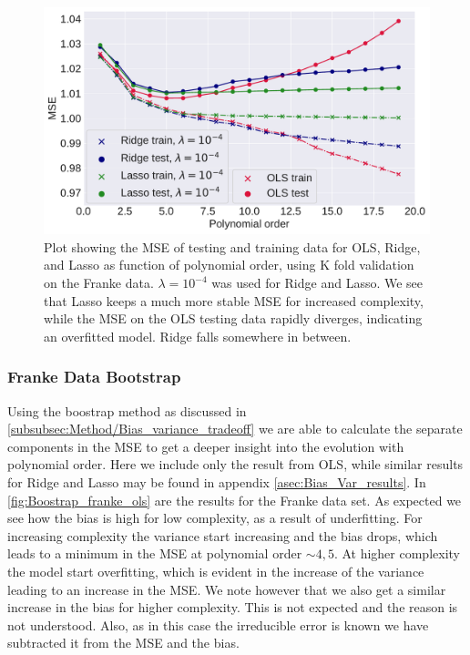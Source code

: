 \documentclass[10pt, twocolumn]{article}
\begin{document}
\begin{figure}[h!]
    \centering
    \includegraphics[scale=0.4]{../figs/Franke_OLS_Ridge_polyorders.pdf}
    \caption{Plot showing the MSE of testing and training data for OLS, Ridge, and Lasso as function of polynomial order, using K fold validation on the Franke data. $\lambda = 10^{-4}$ was used for Ridge and Lasso. We see that Lasso keeps a much more stable MSE for increased complexity, while the MSE on the OLS testing data rapidly diverges, indicating an overfitted model. Ridge falls somewhere in between.}
    \label{fig:bias_var_franke}
\end{figure}


\subsubsection{Franke Data Bootstrap}
Using the boostrap method as discussed in \cref{subsubsec:Method/Bias_variance_tradeoff} we are able to calculate the separate components in the MSE to get a deeper insight into the evolution with polynomial order. Here we include only the result from OLS, while similar results for Ridge and Lasso may be found in appendix \ref{asec:Bias_Var_results}. In \cref{fig:Boostrap_franke_ols} are the results for the Franke data set. As expected we see how the bias is high for low complexity, as a result of underfitting. For increasing complexity the variance start increasing and the bias drops, which leads to a minimum in the MSE at polynomial order $\sim 4,5$. At higher complexity the model start overfitting, which is evident in the increase of the variance leading to an increase in the MSE. We note however that we also get a similar increase in the bias for higher complexity. This is not expected and the reason is not understood. Also, as in this case the irreducible error is known we have subtracted it from the MSE and the bias.
\end{document}
